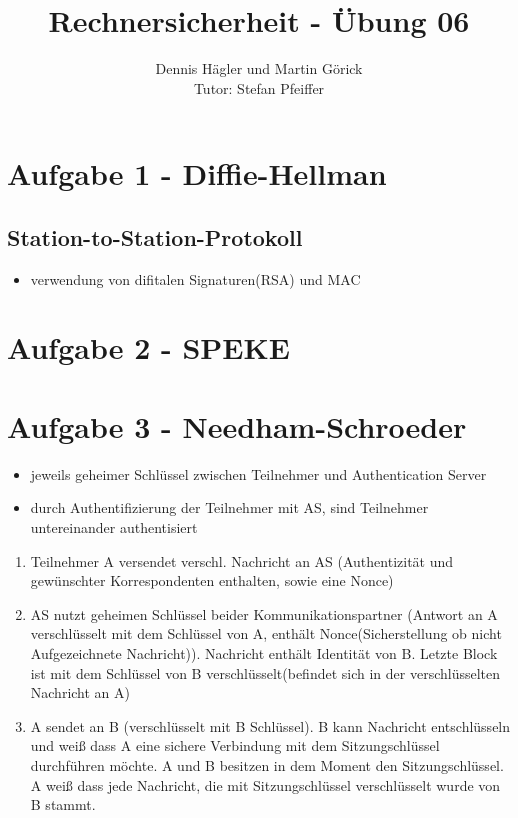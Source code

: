 \documentclass{scrartcl}
\title{Rechnersicherheit - Übung 06}
\author{Dennis Hägler und Martin Görick \\ Tutor: Stefan Pfeiffer}
\begin{document}
\maketitle


\section*{Aufgabe 1 - Diffie-Hellman}
\subsection{Station-to-Station-Protokoll}
\begin{itemize}
  \item verwendung von difitalen Signaturen(RSA) und MAC
\end{itemize}

\section*{Aufgabe 2 - SPEKE}

\section*{Aufgabe 3 - Needham-Schroeder}
\begin{itemize}
  \item jeweils geheimer Schlüssel zwischen Teilnehmer und Authentication Server
  \item durch Authentifizierung der Teilnehmer mit AS, sind Teilnehmer
    untereinander authentisiert
\end{itemize}
\begin{enumerate}
  \item Teilnehmer A versendet verschl. Nachricht an AS (Authentizität und
    gewünschter Korrespondenten enthalten, sowie eine Nonce)
  \item AS nutzt geheimen Schlüssel beider Kommunikationspartner (Antwort an A
    verschlüsselt mit dem Schlüssel von A, enthält Nonce(Sicherstellung ob
    nicht Aufgezeichnete Nachricht)). Nachricht enthält Identität von B.
    Letzte Block ist mit dem Schlüssel von B verschlüsselt(befindet sich in der
    verschlüsselten Nachricht an A)
  \item A sendet an B (verschlüsselt mit B Schlüssel). B kann Nachricht
    entschlüsseln und weiß dass A eine sichere Verbindung mit dem
    Sitzungschlüssel durchführen möchte. A und B besitzen in dem Moment den
    Sitzungschlüssel. A weiß dass jede Nachricht, die mit Sitzungschlüssel
    verschlüsselt wurde von B stammt.
\end{enumerate}
\end{document}
